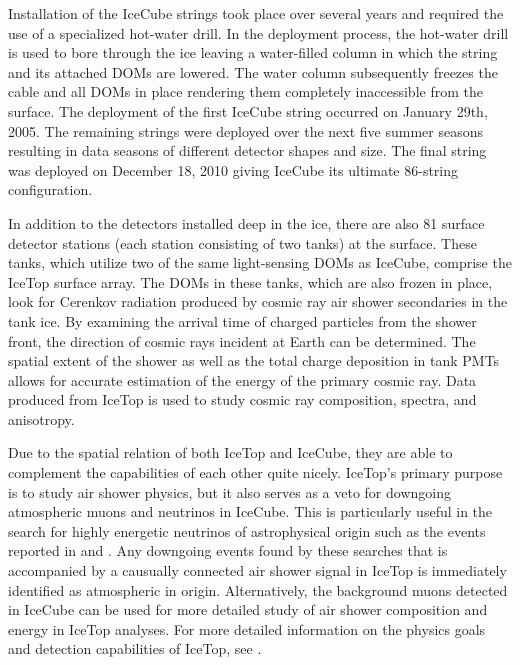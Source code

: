 \documentclass{gatech-thesis}
\begin{document}
Installation of the IceCube strings took place over several years and required the use of a specialized hot-water drill. In the deployment process, the hot-water drill is used to bore through the ice leaving a water-filled column in which the string and its attached DOMs are lowered. The water column subsequently freezes the cable and all DOMs in place rendering them completely inaccessible from the surface. The deployment of the first IceCube string occurred on January 29th, 2005. The remaining strings were deployed over the next five summer seasons resulting in data seasons of different detector shapes and size. The final string was deployed on December 18, 2010 giving IceCube its ultimate 86-string configuration.


In addition to the detectors installed deep in the ice, there are also 81 surface detector stations (each station consisting of two tanks) at the surface. These tanks, which utilize two of the same light-sensing DOMs as IceCube, comprise the IceTop surface array. The DOMs in these tanks, which are also frozen in place, look for Cerenkov radiation produced by cosmic ray air shower secondaries in the tank ice. By examining the arrival time of charged particles from the shower front, the direction of cosmic rays incident at Earth can be determined. The spatial extent of the shower as well as the total charge deposition in tank PMTs allows for accurate estimation of the energy of the primary cosmic ray. Data produced from IceTop is used to study cosmic ray composition, spectra, and anisotropy.

Due to the spatial relation of both IceTop and IceCube, they are able to complement the capabilities of each other quite nicely. IceTop's primary purpose is to study air shower physics, but it also serves as a veto for downgoing atmospheric muons and neutrinos in IceCube. This is particularly useful in the search for highly energetic neutrinos of astrophysical origin such as the events reported in \cite{2013Sci...342E...1I} and \cite{2014PhRvL.113j1101A}. Any downgoing events found by these searches that is accompanied by a causually connected air shower signal in IceTop is immediately identified as atmospheric in origin. Alternatively, the background muons detected in IceCube can be used for more detailed study of air shower composition and energy in IceTop analyses. For more detailed information on the physics goals and detection capabilities of IceTop, see \cite{2013NIMPA.700..188A}.
\end{document}
